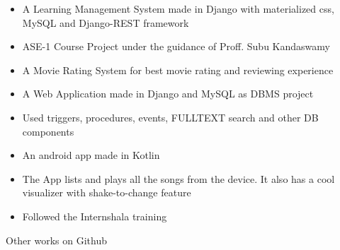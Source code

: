 \documentclass[10pt,a4paper]{altacv}
\begin{document}
\divider




\begin{itemize}
  \item \small{A Learning Management System made in Django with materialized css, MySQL and Django-REST framework}
  \item ASE-1 Course Project under the guidance of Proff. Subu Kandaswamy
\end{itemize}

\divider

%



\begin{itemize}
  \item \small{A Movie Rating System for best movie rating and reviewing experience}
  \item A Web Application made in Django and MySQL as DBMS project
  \item Used triggers, procedures, events, FULLTEXT search and other DB components
\end{itemize}

\divider



\begin{itemize}
  \item \small{An android app made in Kotlin}
  \item The App lists and plays all the songs from the device. It also has a cool visualizer with shake-to-change feature
  \item Followed the Internshala training
\end{itemize}

\divider

Other works on Github
\end{document}
